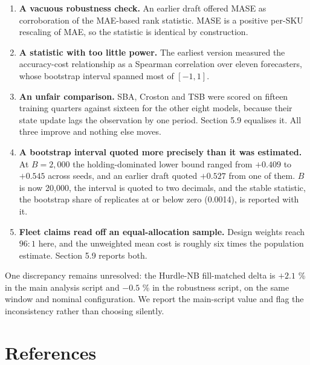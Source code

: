 \documentclass[11pt]{article}
\begin{document}
\begin{enumerate}
  deployed policy was beaten by every model-driven policy. LightGBM does not
  beat it.
\item \textbf{A vacuous robustness check.} An earlier draft offered MASE as
  corroboration of the MAE-based rank statistic. MASE is a positive per-SKU
  rescaling of MAE, so the statistic is identical by construction.
\item \textbf{A statistic with too little power.} The earliest version measured
  the accuracy-cost relationship as a Spearman correlation over eleven
  forecasters, whose bootstrap interval spanned most of $[-1, 1]$.
\item \textbf{An unfair comparison.} SBA, Croston and TSB were scored on
  fifteen training quarters against sixteen for the other eight models, because
  their state update lags the observation by one period. Section 5.9 equalises
  it. All three improve and nothing else moves.
\item \textbf{A bootstrap interval quoted more precisely than it was
  estimated.} At $B = 2{,}000$ the holding-dominated lower bound ranged from
  $+0.409$ to $+0.545$ across seeds, and an earlier draft quoted $+0.527$ from
  one of them. $B$ is now 20{,}000, the interval is quoted to two decimals, and
  the stable statistic, the bootstrap share of replicates at or below zero
  (0.0014), is reported with it.
\item \textbf{Fleet claims read off an equal-allocation sample.} Design weights
  reach $96 : 1$ here, and the unweighted mean cost is roughly six times the
  population estimate. Section 5.9 reports both.
\end{enumerate}

One discrepancy remains unresolved: the Hurdle-NB fill-matched delta is
$+2.1$ \% in the main analysis script and $-0.5$ \% in the robustness script,
on the same window and nominal configuration. We report the main-script value
and flag the inconsistency rather than choosing silently.

\section*{References}
\end{document}
